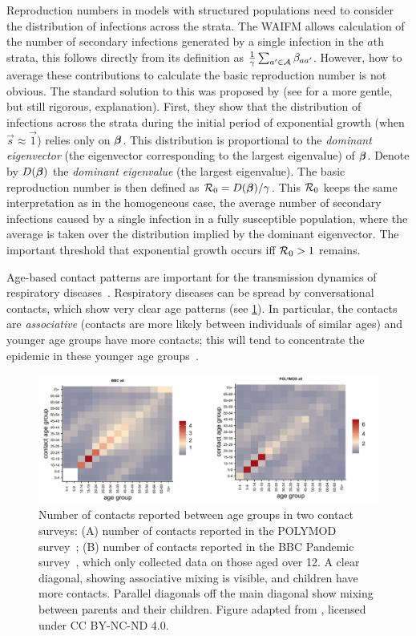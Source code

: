 \documentclass[thesis.tex]{subfiles}
\begin{document}
Reproduction numbers in models with structured populations need to consider the distribution of infections across the strata.
The WAIFM allows calculation of the number of secondary infections generated by a single infection in the $a$th strata,  this follows directly from its definition as $\frac{1}{\gamma} \sum_{a' \in \mathcal{A}} \beta_{aa'}$. 
However, how to average these contributions to calculate the basic reproduction number is not obvious.
The standard solution to this was proposed by \textcite{diekmannDefinition} (see \textcite[chapter 7]{diekmannMathematical} for a more gentle, but still rigorous, explanation).
First, they show that the distribution of infections across the strata during the initial period of exponential growth (when $\vec{s} \approx \vec{1}$) relies only on $\bm{\beta}$.
This distribution is proportional to the \emph{dominant eigenvector} (the eigenvector corresponding to the largest eigenvalue) of $\bm{\beta}$.
Denote by $D(\bm{\beta})$ the \emph{dominant eigenvalue} (the largest eigenvalue).
The basic reproduction number is then defined as $\mathcal{R}_{0} = D(\bm{\beta}) / \gamma$.
This $\mathcal{R}_{0}$ keeps the same interpretation as in the homogeneous case, \ie the average number of secondary infections caused by a single infection in a fully susceptible population, where the average is taken over the distribution implied by the dominant eigenvector.
The important threshold that exponential growth occurs iff $\mathcal{R}_{0} > 1$ remains.

Age-based contact patterns are important for the transmission dynamics of respiratory diseases~\autocites{birrellBayesian}{jacksonEffects}.
Respiratory diseases can be spread by conversational contacts, which show very clear age patterns (see \cref{SEIR:fig:age-contacts}).
In particular, the contacts are \emph{associative} (contacts are more likely between individuals of similar ages) and younger age groups have more contacts; this will tend to concentrate the epidemic in these younger age groups~\autocite[67]{keelingModeling}.
\begin{figure}
  \centering \includegraphics[width=\textwidth]{SEIR/contact_matrices}
  \caption[Age-based contact matrices]{Number of contacts reported between age groups in two contact surveys: (A) number of contacts reported in the POLYMOD survey~\autocite{mossongSocial}; (B) number of contacts reported in the BBC Pandemic survey~\autocite{klepacContacts}, which only collected data on those aged over 12. A clear diagonal, showing associative mixing is visible, and children have more contacts. Parallel diagonals off the main diagonal show mixing between parents and their children. Figure adapted from \textcite{klepacContacts}, licensed under CC BY-NC-ND 4.0.}
  \label{SEIR:fig:age-contacts}
\end{figure}
\end{document}
